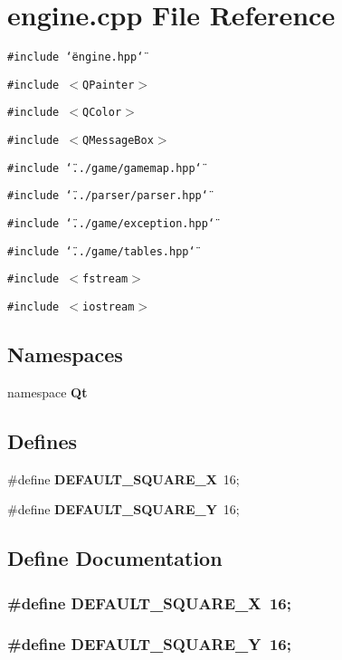 \section{engine.cpp File Reference}
\label{engine_8cpp}
{\tt \#include \char`\"{}engine.hpp\char`\"{}}\par
{\tt \#include $<$QPainter$>$}\par
{\tt \#include $<$QColor$>$}\par
{\tt \#include $<$QMessage\-Box$>$}\par
{\tt \#include \char`\"{}../game/gamemap.hpp\char`\"{}}\par
{\tt \#include \char`\"{}../parser/parser.hpp\char`\"{}}\par
{\tt \#include \char`\"{}../game/exception.hpp\char`\"{}}\par
{\tt \#include \char`\"{}../game/tables.hpp\char`\"{}}\par
{\tt \#include $<$fstream$>$}\par
{\tt \#include $<$iostream$>$}\par
\subsection*{Namespaces}
\begin{CompactItemize}
\item 
namespace {\bf Qt}
\end{CompactItemize}
\subsection*{Defines}
\begin{CompactItemize}
\item 
\#define {\bf DEFAULT\_\-SQUARE\_\-X}~16;
\item 
\#define {\bf DEFAULT\_\-SQUARE\_\-Y}~16;
\end{CompactItemize}


\subsection{Define Documentation}
\subsubsection{\setlength{\rightskip}{0pt plus 5cm}\#define DEFAULT\_\-SQUARE\_\-X~16;}\label{engine_8cpp_a0}


\subsubsection{\setlength{\rightskip}{0pt plus 5cm}\#define DEFAULT\_\-SQUARE\_\-Y~16;}\label{engine_8cpp_a1}


